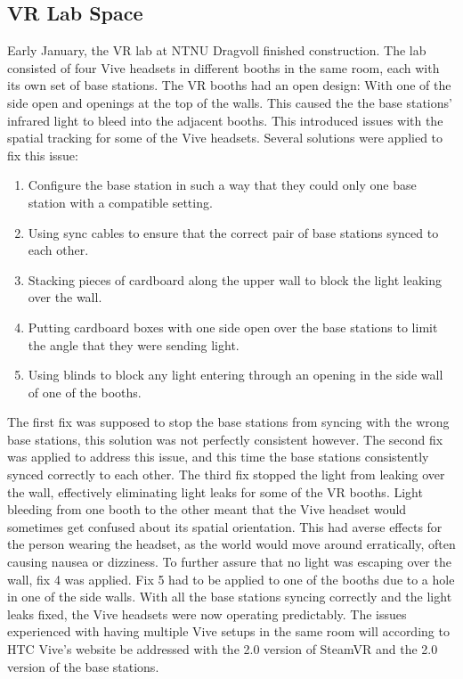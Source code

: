        \subsection{VR Lab Space} \label{sec:vrlabfixes}
        
        Early January, the VR lab at NTNU Dragvoll finished construction. The lab consisted of four Vive headsets in different booths in the same room, each with its own set of base stations. The VR booths had an open design: With one of the side open and openings at the top of the walls. This caused the the base stations' infrared light to bleed into the adjacent booths. This introduced issues with the spatial tracking for some of the Vive headsets. Several solutions were applied to fix this issue: 
        \begin{enumerate}
            \item Configure the base station in such a way that they could only one base station with a compatible setting.
            \item Using sync cables to ensure that the correct pair of base stations synced to each other.
            \item Stacking pieces of cardboard along the upper wall to block the light leaking over the wall.
            \item Putting cardboard boxes with one side open over the base stations to limit the angle that they were sending light.
            \item Using blinds to block any light entering through an opening in the side wall of one of the booths.
        \end{enumerate}
        
        The first fix was supposed to stop the base stations from syncing with the wrong base stations, this solution was not perfectly consistent however. The second fix was applied to address this issue, and this time the base stations consistently synced correctly to each other. The third fix stopped the light from leaking over the wall, effectively eliminating light leaks for some of the VR booths. Light bleeding from one booth to the other meant that the Vive headset would sometimes get confused about its spatial orientation. This had averse effects for the person wearing the headset, as the world would move around erratically, often causing nausea or dizziness. To further assure that no light was escaping over the wall, fix 4 was applied. Fix 5 had to be applied to one of the booths due to a hole in one of the side walls. With all the base stations syncing correctly and the light leaks fixed, the Vive headsets were now operating predictably. The issues experienced with having multiple Vive setups in the same room will according to HTC Vive's website be addressed with the 2.0 version of SteamVR and the 2.0 version of the base stations. %
 
